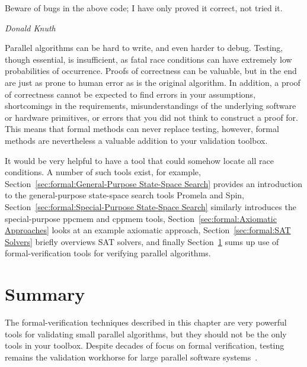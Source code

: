 

\epigraph{Beware of bugs in the above code; I have only proved it correct,
	  not tried it.}{\emph{Donald Knuth}}


Parallel algorithms can be hard to write, and even harder to debug.
Testing, though essential, is insufficient, as fatal race conditions
can have extremely low probabilities of occurrence.
Proofs of correctness can be valuable, but in the end are just as
prone to human error as is the original algorithm.
In addition, a proof of correctness cannot be expected to find errors
in your assumptions, shortcomings in the requirements,
misunderstandings of the underlying software or hardware primitives,
or errors that you did not think to construct a proof for.
This means that formal methods can never replace testing, however,
formal methods are nevertheless a valuable addition to your validation toolbox.

It would be very helpful to have a tool that could somehow locate
all race conditions.
A number of such tools exist, for example,
Section~\ref{sec:formal:General-Purpose State-Space Search} provides an
introduction to the general-purpose state-space search tools Promela and Spin,
Section~\ref{sec:formal:Special-Purpose State-Space Search}
similarly introduces the special-purpose ppcmem and cppmem tools,
Section~\ref{sec:formal:Axiomatic Approaches}
looks at an example axiomatic approach,
Section~\ref{sec:formal:SAT Solvers}
briefly overviews SAT solvers,
and finally
Section~\ref{sec:formal:Summary}
sums up use of formal-verification tools for verifying parallel algorithms.







\section{Summary}
\label{sec:formal:Summary}

The formal-verification techniques described in this chapter
are very powerful tools for validating small
parallel algorithms, but they should not be the only tools in your toolbox.
Despite decades of focus on formal verification, testing remains the
validation workhorse for large parallel software
systems~\cite{JonathanCorbet2006lockdep,DaveJones2011Trinity}.

